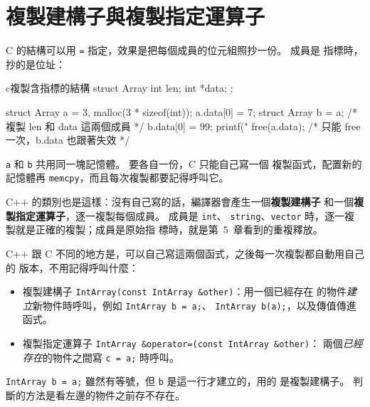 \section{複製建構子與複製指定運算子}
\label{sec:copy}

\begin{crecap}[結構指定只複製成員]
C 的結構可以用 \texttt{=} 指定，效果是把每個成員的位元組照抄一份。 成員是
指標時，抄的是位址：

\begin{code}{c}{複製含指標的結構}
struct Array {
    int len;
    int *data;
};

struct Array a = {3, malloc(3 * sizeof(int))};
a.data[0] = 7;
struct Array b = a;     /* 複製 len 和 data 這兩個成員 */
b.data[0] = 99;
printf("%
free(a.data);           /* 只能 free 一次，b.data 也跟著失效 */
\end{code}

\texttt{a} 和 \texttt{b} 共用同一塊記憶體。 要各自一份，C 只能自己寫一個
複製函式，配置新的記憶體再 \texttt{memcpy}，而且每次複製都要記得呼叫它。
\end{crecap}

C++ 的類別也是這樣：沒有自己寫的話，編譯器會產生一個\textbf{複製建構子}
和一個\textbf{複製指定運算子}，逐一複製每個成員。 成員是 \texttt{int}、
\texttt{string}、\texttt{vector} 時，逐一複製就是正確的複製；成員是原始指
標時，就是第~5~章看到的重複釋放。

C++ 跟 C 不同的地方是，可以自己寫這兩個函式，之後每一次複製都自動用自己的
版本，不用記得呼叫什麼：

\begin{itemize}
\item 複製建構子 \texttt{IntArray(const IntArray \&other)}：用一個已經存在
的物件\emph{建立}新物件時呼叫，例如 \texttt{IntArray b = a;}、
\texttt{IntArray b(a);}，以及傳值傳進函式。
\item 複製指定運算子 \texttt{IntArray \&operator=(const IntArray \&other)}：
兩個\emph{已經存在}的物件之間寫 \texttt{c = a;} 時呼叫。
\end{itemize}

\texttt{IntArray b = a;} 雖然有等號，但 \texttt{b} 是這一行才建立的，用的
是複製建構子。 判斷的方法是看左邊的物件之前存不存在。

